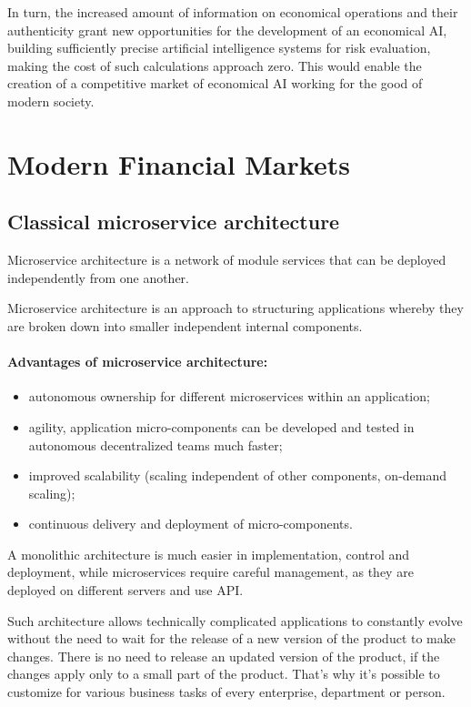 \documentclass{article}
\begin{document}
\begin{multicols}{2}
In turn, the increased amount of information on economical operations and their authenticity grant new opportunities for the development of an economical AI, building sufficiently precise artificial intelligence systems for risk evaluation, making the cost of such calculations approach zero. This would enable the creation of a competitive market of economical AI working for the good of modern society. 

\section{Modern Financial Markets}

\subsection{Classical microservice architecture}

Microservice architecture is a network of module services that can be deployed independently from one another.

Microservice architecture is an approach to structuring applications whereby they are broken down into smaller independent internal components.

\paragraph{Advantages of microservice architecture:}

\begin{itemize}
\item autonomous ownership for different microservices within an application;
\item agility, application micro-components can be developed and tested in autonomous decentralized teams much faster;
\item improved scalability (scaling independent of other components, on-demand scaling);
\item continuous delivery and deployment of micro-components.
\end{itemize}

A monolithic architecture is much easier in implementation, control and deployment, while microservices require careful management, as they are deployed on different servers and use API.

Such architecture allows technically complicated applications to constantly evolve without the need to wait for the release of a new version of the product to make changes. There is no need to release an updated version of the product, if the changes apply only to a small part of the product. That’s why it’s possible to customize for various business tasks of every enterprise, department or person.


\end{multicols}
\end{document}
